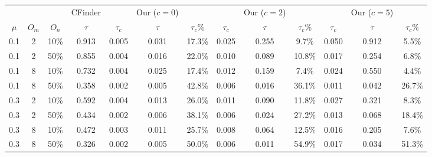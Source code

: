 \begin{table}
\begin{tabular}{ c c c || c | c c c | c c c | c c c }
\toprule\toprule
 	&  		& 		&	CFinder	&			&	Our ($c=0$)		&			&			&	Our ($c=2$)		&			&			&	Our ($c=5$)		&			\\
$\mu$&$O_m$	&$O_n$	&	$\tau$	&	$\tau_c$	&	$\tau$	&$\tau_c\%$	&	$\tau_c$	&	$\tau$	&$\tau_c\%$	&	$\tau_c$	&	$\tau$	&$\tau_c\%$	\\
\hline\hline
0.1	&	2	&	10\%	&	0.913	&	0.005	&	0.031	&	17.3\%	&	0.025	&	0.255	&	9.7\%	&	0.050	&	0.912	&	5.5\%	\\
0.1	&	2	&	50\%	&	0.855	&	0.004	&	0.016	&	22.0\%	&	0.010	&	0.089	&	10.8\%	&	0.017	&	0.254	&	6.8\%	\\
0.1	&	8	&	10\%	&	0.732	&	0.004	&	0.025	&	17.4\%	&	0.012	&	0.159	&	7.4\%	&	0.024	&	0.550	&	4.4\%	\\
0.1	&	8	&	50\%	&	0.358	&	0.002	&	0.005	&	42.8\%	&	0.006	&	0.016	&	36.1\%	&	0.011	&	0.042	&	26.7\%	\\
0.3	&	2	&	10\%	&	0.592	&	0.004	&	0.013	&	26.0\%	&	0.011	&	0.090	&	11.8\%	&	0.027	&	0.321	&	8.3\%	\\
0.3	&	2	&	50\%	&	0.434	&	0.002	&	0.006	&	38.1\%	&	0.006	&	0.024	&	27.2\%	&	0.013	&	0.068	&	18.4\%	\\
0.3	&	8	&	10\%	&	0.472	&	0.003	&	0.011	&	25.7\%	&	0.008	&	0.064	&	12.5\%	&	0.016	&	0.205	&	7.6\%	\\
0.3	&	8	&	50\%	&	0.326	&	0.002	&	0.005	&	50.0\%	&	0.006	&	0.011	&	54.9\%	&	0.017	&	0.034	&	51.3\%	\\\bottomrule\bottomrule
\end{tabular}

\end{table}
